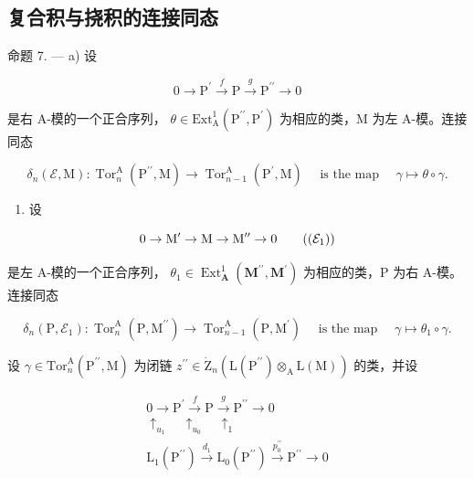 \subsection{复合积与挠积的连接同态}

命题 7. --- a) 设

\[
0 \to \mathrm{P} ^ {\prime} \xrightarrow {f} \mathrm{P} \xrightarrow {g} \mathrm{P} ^ {\prime \prime} \to 0\tag{8}
\]

是右 A-模的一个正合序列， \(\theta\in\mathrm{Ext}_{\mathrm{A}}^{1}\left(\mathrm{P}^{\prime\prime},\mathrm{P}^{\prime}\right)\) 为相应的类，M 为左 A-模。连接同态

\[
\delta_ {n} (\mathcal {E}, \mathrm{M}): \operatorname{Tor} _ {n} ^ {\mathrm{A}} \left(\mathrm{P} ^ {\prime \prime}, \mathrm{M}\right)\rightarrow \operatorname{Tor} _ {n - 1} ^ {\mathrm{A}} \left(\mathrm{P} ^ {\prime}, \mathrm{M}\right) \quad \text { is the map } \quad\gamma \mapsto \theta \circ \gamma .
\]

\begin{enumerate}
\def\labelenumi{\alph{enumi})}
\setcounter{enumi}{1}
\tightlist
\item
  设
\end{enumerate}

\[
0 \rightarrow \mathrm{M} ^ {\prime} \rightarrow \mathrm{M} \rightarrow \mathrm{M} ^ {\prime \prime} \rightarrow 0\tag{$(\mathcal{E}_1)$}
\]

是左 A-模的一个正合序列， \(\theta_{1} \in \operatorname{Ext}_{\mathbf{A}}^{1}(\mathbf{M}^{\prime \prime}, \mathbf{M}^{\prime})\) 为相应的类，P 为右 A-模。连接同态

\[
\delta_ {n} (\mathrm{P}, \mathcal {E} _ {1}): \operatorname{Tor} _ {n} ^ {\mathrm{A}} (\mathrm{P}, \mathrm{M} ^ {\prime \prime}) \rightarrow \operatorname{Tor} _ {n - 1} ^ {\mathrm{A}} (\mathrm{P}, \mathrm{M} ^ {\prime}) \quad \text { is the map } \quad\gamma \mapsto \theta_ {1} \circ \gamma .
\]

设 \(\gamma\in\mathrm{Tor}_{n}^{\mathrm{A}}(\mathrm{P}^{\prime\prime},\mathrm{M})\) 为闭链 \(z^{\prime\prime}\in\dot{\mathrm{Z}}_{n}(\mathrm{L}(\mathrm{P}^{\prime\prime})\otimes_{\mathrm{A}}\mathrm{L}(\mathrm{M}))\) 的类，并设

\[
\begin{array}{c} 0 \longrightarrow \mathrm{P} ^ {\prime} \xrightarrow {f} \mathrm{P} \xrightarrow {g} \mathrm{P} ^ {\prime \prime} \longrightarrow 0 \\ \uparrow_ {u _ {1}} \quad \uparrow_ {u _ {0}} \quad \uparrow_ {1} \\ \mathrm{L} _ {1} (\mathrm{P} ^ {\prime \prime}) \xrightarrow {d _ {1}} \mathrm{L} _ {0} (\mathrm{P} ^ {\prime \prime}) \xrightarrow {p _ {0} ^ {\prime \prime}} \mathrm{P} ^ {\prime \prime} \longrightarrow 0 \end{array}
\]

